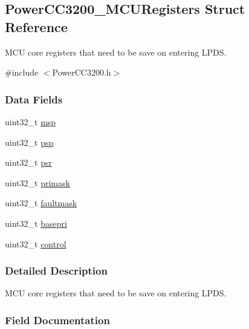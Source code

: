 \subsection{Power\+C\+C3200\+\_\+\+M\+C\+U\+Registers Struct Reference}
\label{struct_power_c_c3200___m_c_u_registers}


M\+C\+U core registers that need to be save on entering L\+P\+D\+S.  




{\ttfamily \#include $<$Power\+C\+C3200.\+h$>$}

\subsubsection*{Data Fields}
\begin{DoxyCompactItemize}
\item 
uint32\+\_\+t \hyperlink{struct_power_c_c3200___m_c_u_registers_a224eeb07161c319f4b2c27a2ac82c0c7}{msp}
\item 
uint32\+\_\+t \hyperlink{struct_power_c_c3200___m_c_u_registers_a714b014d96e728e0e81d110b47a9f616}{psp}
\item 
uint32\+\_\+t \hyperlink{struct_power_c_c3200___m_c_u_registers_abb389a49f808627c7a95e0eac6980239}{psr}
\item 
uint32\+\_\+t \hyperlink{struct_power_c_c3200___m_c_u_registers_aaead7117c81abf787e454888be380852}{primask}
\item 
uint32\+\_\+t \hyperlink{struct_power_c_c3200___m_c_u_registers_ac077e243991c64d4deadb99ca3671c8f}{faultmask}
\item 
uint32\+\_\+t \hyperlink{struct_power_c_c3200___m_c_u_registers_a9c7eb58ae648181513844561a0fcc486}{basepri}
\item 
uint32\+\_\+t \hyperlink{struct_power_c_c3200___m_c_u_registers_a677d06a2066aecca92d9c587333f791c}{control}
\end{DoxyCompactItemize}


\subsubsection{Detailed Description}
M\+C\+U core registers that need to be save on entering L\+P\+D\+S. 

\subsubsection{Field Documentation}
